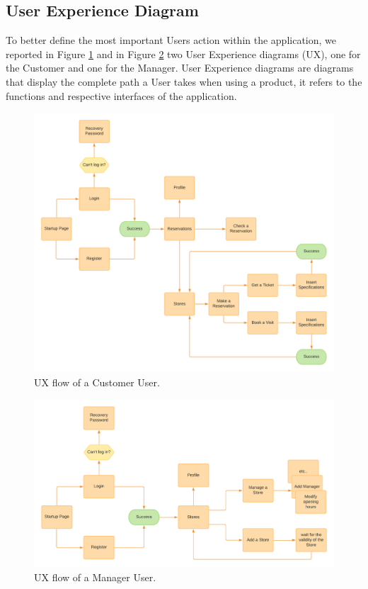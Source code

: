 \documentclass[a4paper, 12pt, oneside, table]{article}
\begin{document}
\subsection{User Experience Diagram}
To better define the most important Users action within the application, we reported in Figure \ref{customer_experience} and in Figure \ref{manager_experience} two User Experience diagrams (UX), one for the Customer and one for the Manager. User Experience diagrams are diagrams that display the complete path a User takes when using a product, it refers to the functions and respective interfaces of the application.
\begin{figure}[h!]
\centering
    \centering
    \includegraphics[height=0.5\textheight, scale=0.2, keepaspectratio]{img/customer_experience.png} 
    \caption{UX flow of a Customer User.}
    \label{customer_experience}
\end{figure}
\newpage
 \begin{figure}[h!]
    \centering
    \includegraphics[height=0.35\textheight, scale=0.2, keepaspectratio]{img/manager_experience.png}
    \caption{UX flow of a Manager User.}
    \label{manager_experience}
\end{figure}
\end{document}
